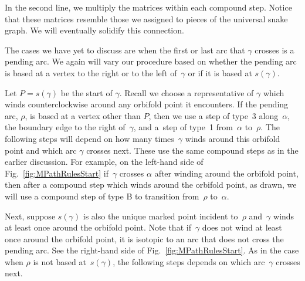 \documentclass[pdftex]{sigma}%
\numberwithin{equation}{section}
\begin{document}
\begin{Example}
In the second line, we multiply the matrices within each compound step. Notice that these matrices resemble those we assigned to pieces of the universal snake graph. We will eventually solidify this connection.
\end{Example}

The cases we have yet to discuss are when the first or last arc that $\gamma$ crosses is a pending arc. We again will vary our procedure based on whether the pending arc is based at a vertex to the right or to the left of~$\gamma$ or if it is based at $s(\gamma)$.

Let $P = s(\gamma)$ be the start of $\gamma$. Recall we choose a representative of $\gamma$ which winds counterclockwise around any orbifold point it encounters. If the pending arc, $\rho$, is based at a vertex other than $P$, then we use a step of type~3 along~$\alpha$, the boundary edge to the right of~$\gamma$, and a~step of type~1 from~$\alpha$ to~$\rho$.
The following steps will depend on how many times~$\gamma$ winds around this orbifold point and which arc $\gamma$ crosses next. These use the same compound steps as in the earlier discussion. For example, on the left-hand side of Fig.~\ref{fig:MPathRulesStart} if~$\gamma$ crosses $\alpha$ after winding around the orbifold point, then after a compound step which winds around the orbifold point, as drawn, we will use a compound step of type B to transition from~$\rho$ to~$\alpha$.

Next, suppose $s(\gamma)$ is also the unique marked point incident to~$\rho$ and~$\gamma$ winds at least once around the orbifold point. Note that if~$\gamma$ does not wind at least once around the orbifold point, it is isotopic to an arc that does not cross the pending arc. See the right-hand side of Fig.~\ref{fig:MPathRulesStart}.
As in the case when $\rho$ is not based at~$s(\gamma)$, the following steps depends on which arc~$\gamma$ crosses next.
\end{document}
